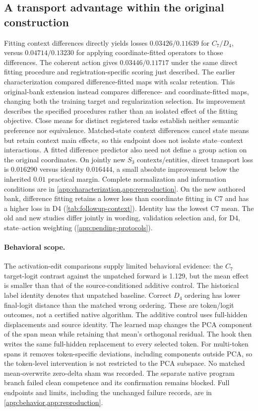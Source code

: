 \subsection{A transport advantage within the original construction}
Fitting context differences directly yields losses $0.03426/0.11639$ for $C_7/D_4$, versus $0.04714/0.13230$ for applying coordinate-fitted operators to those differences. The coherent action gives $0.03446/0.11717$ under the same direct fitting procedure and registration-specific scoring just described. The earlier characterization compared difference-fitted maps with scalar retention. This original-bank extension instead compares difference- and coordinate-fitted maps, changing both the training target and regularization selection. Its improvement describes the specified procedures rather than an isolated effect of the fitting objective. Close means for distinct registered tasks establish neither semantic preference nor equivalence. Matched-state context differences cancel state means but retain context main effects, so this endpoint does not isolate state--context interactions. A fitted difference predictor also need not define a group action on the original coordinates. On jointly new $S_3$ contexts/entities, direct transport loss is $0.016290$ versus identity $0.016444$, a small absolute improvement below the inherited $0.01$ practical margin. Complete normalization and information conditions are in \cref{app:characterization,app:reproduction}. On the new authored bank, difference fitting retains a lower loss than coordinate fitting in C7 and has a higher loss in D4 (\cref{tab:followup-context}). Identity has the lowest C7 mean. The old and new studies differ jointly in wording, validation selection and, for D4, state--action weighting (\cref{app:pending-protocols}).

\paragraph{Behavioral scope.}
The activation-edit comparisons supply limited behavioral evidence: the $C_7$ target-logit contrast against the unpatched forward is 1.129, but the mean effect is smaller than that of the source-conditioned additive control. The historical label identity denotes that unpatched baseline. Correct $D_4$ ordering has lower final-logit distance than the matched wrong ordering. These are token/logit outcomes, not a certified native algorithm. The additive control uses full-hidden displacements and source identity. The learned map changes the PCA component of the span mean while retaining that mean's orthogonal residual. The hook then writes the same full-hidden replacement to every selected token. For multi-token spans it removes token-specific deviations, including components outside PCA, so the token-level intervention is not restricted to the PCA subspace. No matched mean-overwrite zero-delta sham was recorded. The separate native program branch failed clean competence and its confirmation remains blocked. Full endpoints and limits, including the unchanged failure records, are in \cref{app:behavior,app:reproduction}.


